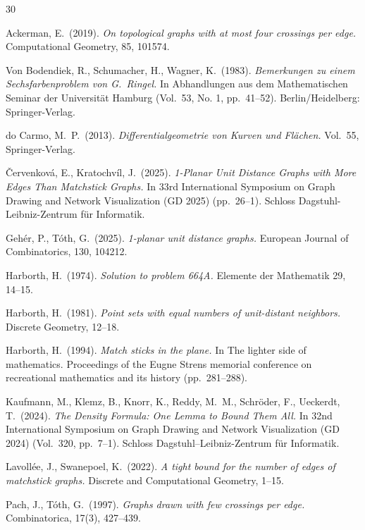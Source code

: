 \documentclass[10pt]{article}
\theoremstyle{definition}
\begin{document}
\newpage
\small
\begin{thebibliography}{30} 


Ackerman, E.\ (2019).
{\it On topological graphs with at most four crossings per edge.}
Computational Geometry, 85, 101574.

Von Bodendiek, R., Schumacher, H., Wagner, K.\ (1983).
{\it Bemerkungen zu einem Sechsfarbenproblem von G.\ Ringel.}
In Abhandlungen aus dem Mathematischen Seminar der Universität Hamburg (Vol.\ 53, No. 1, pp.\ 41--52). Berlin/Heidelberg: Springer-Verlag.

do Carmo, M.\ P.\ (2013).
{\it Differentialgeometrie von Kurven und Fl\"achen.}
Vol.\ 55, Springer-Verlag.


\v{C}ervenkov\'a, E., Kratochv\'il, J.\ (2025).
{\it 1-Planar Unit Distance Graphs with More Edges Than Matchstick Graphs.}
In 33rd International Symposium on Graph Drawing and Network Visualization (GD 2025) (pp.\ 26--1). Schloss Dagstuhl-Leibniz-Zentrum für Informatik.


Geh\'er, P., Tóth, G.\ (2025).
{\it 1-planar unit distance graphs.}
European Journal of Combinatorics, 130, 104212.

Harborth, H.\ (1974).
{\it Solution to problem 664A.}
Elemente der Mathematik 29, 14--15.

Harborth, H.\ (1981).
{\it Point sets with equal numbers of unit-distant neighbors.}
Discrete Geometry, 12--18.

Harborth, H.\ (1994).
{\it Match sticks in the plane.}
In The lighter side of mathematics. Proceedings of the Eugne Strens memorial conference on recreational mathematics and its history (pp.\ 281--288).

Kaufmann, M., Klemz, B., Knorr, K., Reddy, M.\ M., Schröder, F., Ueckerdt, T.\ (2024).
{\it The Density Formula: One Lemma to Bound Them All.} In 32nd International Symposium on Graph Drawing and Network Visualization (GD 2024) (Vol.\ 320, pp.\ 7--1). Schloss Dagstuhl–Leibniz-Zentrum für Informatik.

Lavoll\'ee, J., Swanepoel, K.\ (2022).
{\it A tight bound for the number of edges of matchstick graphs.}
Discrete and Computational Geometry, 1--15.


Pach, J., T\'oth, G.\ (1997).
{\it Graphs drawn with few crossings per edge.}
Combinatorica, 17(3), 427--439.

\end{thebibliography}
\end{document}
